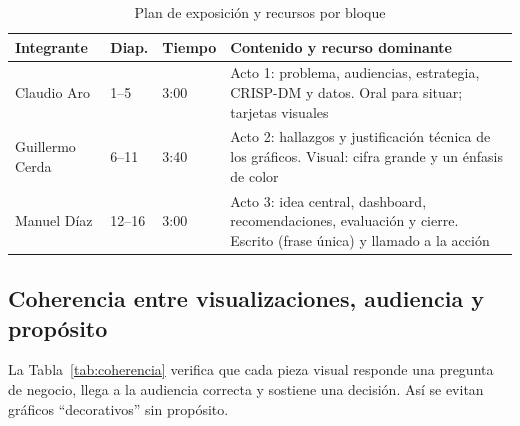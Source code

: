 \documentclass[conference,a4paper]{IEEEtran}
\begin{document}
\begin{table}[!t]
\caption{Plan de exposición y recursos por bloque}
\label{tab:exposicion}
\centering\footnotesize
\begin{tabularx}{\columnwidth}{@{}P{1.35cm}P{1.05cm}P{0.8cm}L@{}}
\toprule
Integrante & Diap. & Tiempo & Contenido y recurso dominante\\
\midrule
Claudio Aro & 1--5 & 3:00 & Acto 1: problema, audiencias, estrategia, CRISP-DM y datos. Oral para situar; tarjetas visuales\\
Guillermo Cerda & 6--11 & 3:40 & Acto 2: hallazgos y justificación técnica de los gráficos. Visual: cifra grande y un énfasis de color\\
Manuel Díaz & 12--16 & 3:00 & Acto 3: idea central, dashboard, recomendaciones, evaluación y cierre. Escrito (frase única) y llamado a la acción\\
\bottomrule
\end{tabularx}
\end{table}

\subsection{Coherencia entre visualizaciones, audiencia y propósito}
\label{sec:coherencia}
La Tabla~\ref{tab:coherencia} verifica que cada pieza visual responde una pregunta de negocio, llega a la audiencia correcta y sostiene una decisión. Así se evitan gráficos ``decorativos'' sin propósito.
\end{document}
